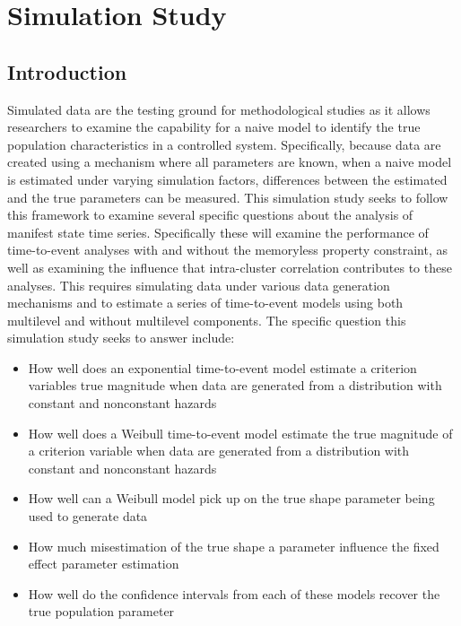 \documentclass[12pt]{./styles/outhesis}
\begin{document}
\chapter{Simulation Study}\label{chap:SimulationStudy}
\section{Introduction}
Simulated data are the testing ground for methodological studies as it
allows researchers to examine the capability for a naive model to
identify the true population characteristics in a controlled system.
Specifically, because data are created using a mechanism where all
parameters are known, when a naive model is estimated under varying
simulation factors, differences between the estimated and the true
parameters can be measured. This simulation study seeks to follow this
framework to examine several specific questions about the analysis of
manifest state time series. Specifically these will examine the
performance of time-to-event analyses with and without the memoryless
property constraint, as well as examining the influence that
intra-cluster correlation contributes to these analyses. This requires
simulating data under various data generation mechanisms and to estimate
a series of time-to-event models using both multilevel and without
multilevel components. The specific question this simulation study seeks
to answer include:

\begin{itemize}
\tightlist
\item
  How well does an exponential time-to-event model estimate a criterion
  variables true magnitude when data are generated from a distribution
  with constant and nonconstant hazards
\item
  How well does a Weibull time-to-event model estimate the true
  magnitude of a criterion variable when data are generated from a
  distribution with constant and nonconstant hazards
\end{itemize}

\begin{itemize}
\item
  How well can a Weibull model pick up on the true shape parameter being
  used to generate data
\item
  How much misestimation of the true shape a parameter influence the
  fixed effect parameter estimation
\item
  How well do the confidence intervals from each of these models recover
  the true population parameter
\end{itemize}
\end{document}
